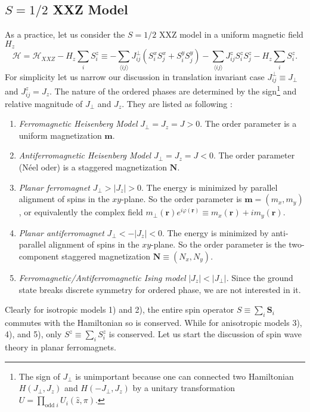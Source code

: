 \documentclass[10pt,nofootinbib,letterpaper]{revtex4}
\def\H{\mathcal{H}}
\begin{document}
	\subsection{$S=1/2$ XXZ Model}
		As a practice, let us consider the $S=1/2$ XXZ model in a uniform magnetic field $H_z$
		\begin{equation}\label{1.1.1}
			\H=\H_{XXZ}-H_z\sum_i S_i^z\equiv-\sum_{\langle ij\rangle}J_{ij}^\perp(S_i^xS_j^x+S_i^yS_j^y)-\sum_{\langle ij\rangle}J_{ij}^zS_i^zS_j^z-H_z\sum_i S_i^z.
		\end{equation}
		For simplicity let us narrow our discussion in translation invariant case $J_{ij}^\perp\equiv J_\perp$ and $J_{ij}^z=J_z$. The nature of the ordered phases are determined by the sign\footnote{The sign of $J_\perp$ is unimportant because one can connected two Hamiltonian $H(J_\perp,J_z)$ and $H(-J_\perp,J_z)$ by a unitary transformation $U=\prod_{\text{odd }i} U_i(\hat{z},\pi)$.} and relative magnitude of $J_\perp$ and $J_z$. They are listed as following \cite{chaikin2000principles}:
		\begin{enumerate}[label=\arabic*)]
			\item \emph{Ferromagnetic Heisenberg Model} $J_\perp=J_z=J>0$. The order parameter is a uniform magnetization $\bm{m}$.
			\item \emph{Antiferromagnetic Heisenberg Model} $J_\perp=J_z=J<0$. The order parameter (N\'{e}el oder) is a staggered magnetization $\bm{N}$.
			\item \emph{Planar ferromagnet} $J_\perp>|J_z|>0$. The energy is minimized by parallel alignment of spins in the $xy$-plane. So the order parameter is $\bm{m}=(m_x,m_y)$, or equivalently the complex field $m_\perp(\bm{r})e^{i\varphi(\bm{r})}\equiv m_x(\bm{r})+im_y(\bm{r})$.
			\item \emph{Planar antiferromagnet} $J_\perp<-|J_z|<0$. The energy is minimized by anti-parallel alignment of spins in the $xy$-plane. So the order parameter is the two-component staggered magnetization $\bm{N}\equiv(N_x,N_y)$.
			\item \emph{Ferromagnetic/Antiferromagnetic Ising model} $|J_z|<|J_\perp|$. Since the ground state breaks discrete symmetry for ordered phase, we are not interested in it.
		\end{enumerate}
		Clearly for isotropic models 1) and 2), the entire spin operator $S\equiv\sum_i\bm{S}_i$ commutes with the Hamiltonian so is conserved. While for anisotropic models 3), 4), and 5), only $S^z\equiv\sum_i S_i^z$ is conserved. Let us start the discussion of spin wave theory in planar ferromagnets.
\end{document}
